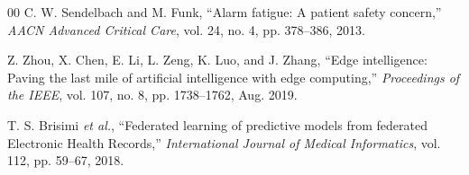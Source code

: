 \documentclass{ieeeaccess}
\begin{document}
\begin{thebibliography}{00}
C. W. Sendelbach and M. Funk, ``Alarm fatigue: A patient safety concern,'' \textit{AACN Advanced Critical Care}, vol. 24, no. 4, pp. 378--386, 2013.

Z. Zhou, X. Chen, E. Li, L. Zeng, K. Luo, and J. Zhang, ``Edge intelligence: Paving the last mile of artificial intelligence with edge computing,'' \textit{Proceedings of the IEEE}, vol. 107, no. 8, pp. 1738--1762, Aug. 2019.

T. S. Brisimi \textit{et al.}, ``Federated learning of predictive models from federated Electronic Health Records,'' \textit{International Journal of Medical Informatics}, vol. 112, pp. 59--67, 2018.

\end{thebibliography}

\EOD
\end{document}
